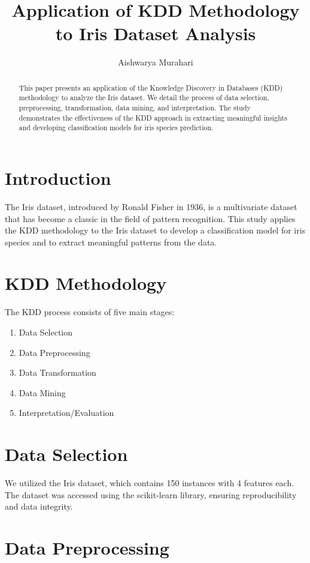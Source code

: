 \documentclass[12pt,a4paper]{article}
\title{Application of KDD Methodology to Iris Dataset Analysis}
\author{Aishwarya Murahari}
\date{}
\begin{document}
\maketitle

\begin{abstract}
This paper presents an application of the Knowledge Discovery in Databases (KDD) methodology to analyze the Iris dataset. We detail the process of data selection, preprocessing, transformation, data mining, and interpretation. The study demonstrates the effectiveness of the KDD approach in extracting meaningful insights and developing classification models for iris species prediction.
\end{abstract}

\section{Introduction}
The Iris dataset, introduced by Ronald Fisher in 1936, is a multivariate dataset that has become a classic in the field of pattern recognition. This study applies the KDD methodology to the Iris dataset to develop a classification model for iris species and to extract meaningful patterns from the data.

\section{KDD Methodology}
The KDD process consists of five main stages:
\begin{enumerate}
    \item Data Selection
    \item Data Preprocessing
    \item Data Transformation
    \item Data Mining
    \item Interpretation/Evaluation
\end{enumerate}

\section{Data Selection}
We utilized the Iris dataset, which contains 150 instances with 4 features each. The dataset was accessed using the scikit-learn library, ensuring reproducibility and data integrity.

\section{Data Preprocessing}
\end{document}
